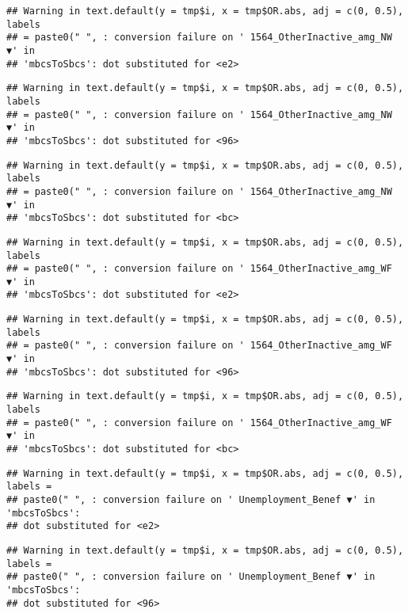 \documentclass[
]{article}
\begin{document}
\begin{verbatim}
## Warning in text.default(y = tmp$i, x = tmp$OR.abs, adj = c(0, 0.5), labels
## = paste0(" ", : conversion failure on ' 1564_OtherInactive_amg_NW ▼' in
## 'mbcsToSbcs': dot substituted for <e2>
\end{verbatim}

\begin{verbatim}
## Warning in text.default(y = tmp$i, x = tmp$OR.abs, adj = c(0, 0.5), labels
## = paste0(" ", : conversion failure on ' 1564_OtherInactive_amg_NW ▼' in
## 'mbcsToSbcs': dot substituted for <96>
\end{verbatim}

\begin{verbatim}
## Warning in text.default(y = tmp$i, x = tmp$OR.abs, adj = c(0, 0.5), labels
## = paste0(" ", : conversion failure on ' 1564_OtherInactive_amg_NW ▼' in
## 'mbcsToSbcs': dot substituted for <bc>
\end{verbatim}

\begin{verbatim}
## Warning in text.default(y = tmp$i, x = tmp$OR.abs, adj = c(0, 0.5), labels
## = paste0(" ", : conversion failure on ' 1564_OtherInactive_amg_WF ▼' in
## 'mbcsToSbcs': dot substituted for <e2>
\end{verbatim}

\begin{verbatim}
## Warning in text.default(y = tmp$i, x = tmp$OR.abs, adj = c(0, 0.5), labels
## = paste0(" ", : conversion failure on ' 1564_OtherInactive_amg_WF ▼' in
## 'mbcsToSbcs': dot substituted for <96>
\end{verbatim}

\begin{verbatim}
## Warning in text.default(y = tmp$i, x = tmp$OR.abs, adj = c(0, 0.5), labels
## = paste0(" ", : conversion failure on ' 1564_OtherInactive_amg_WF ▼' in
## 'mbcsToSbcs': dot substituted for <bc>
\end{verbatim}

\begin{verbatim}
## Warning in text.default(y = tmp$i, x = tmp$OR.abs, adj = c(0, 0.5), labels =
## paste0(" ", : conversion failure on ' Unemployment_Benef ▼' in 'mbcsToSbcs':
## dot substituted for <e2>
\end{verbatim}

\begin{verbatim}
## Warning in text.default(y = tmp$i, x = tmp$OR.abs, adj = c(0, 0.5), labels =
## paste0(" ", : conversion failure on ' Unemployment_Benef ▼' in 'mbcsToSbcs':
## dot substituted for <96>
\end{verbatim}
\end{document}
